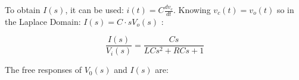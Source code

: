\documentclass[a4paper,12pt]{article}
\begin{document}
To obtain $I(s)$, it can be used: $i(t)=C\frac{dv_c}{dt}$. Knowing $v_c(t)=v_o(t)$ so in the Laplace Domain: $I(s)=C \cdot sV_o(s)$ : 

\vspace{0.5cm}

\begin{equation}
\frac{I(s)}{V_i(s)}=\frac{Cs}{LCs^2+RCs+1 }
\end{equation}

\vspace{1cm}

















The free responses of $V_0(s)$ and $I(s)$ are:

\vspace{0.5cm}
\end{document}
